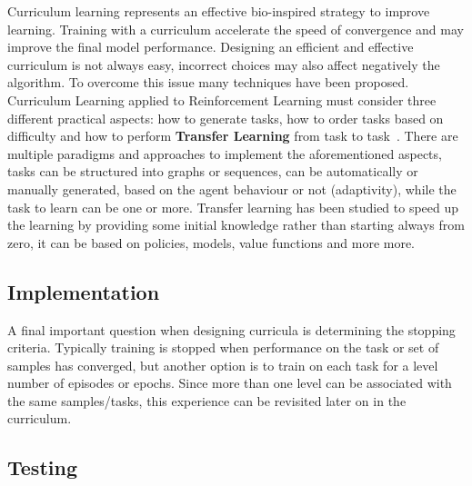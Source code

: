 \documentclass[11pt, a4paper, hidelinks]{report}
\begin{document}
Curriculum learning represents an effective bio-inspired strategy to improve learning.
Training with a curriculum accelerate the speed of convergence and may improve the final model performance.
Designing an efficient and effective curriculum is not always easy, incorrect choices may also affect negatively the algorithm.
To overcome this issue many techniques have been proposed.
Curriculum Learning applied to Reinforcement Learning must consider three different practical aspects: how to generate tasks, how to order tasks based on difficulty and how to perform \textbf{Transfer Learning} from task to task~\cite{narvekar2020curriculum}.
There are multiple paradigms and approaches to implement the aforementioned aspects, tasks can be structured into graphs or sequences, can be automatically or manually generated, based on the agent behaviour or not (adaptivity), while the task to learn can be one or more.
Transfer learning has been studied to speed up the learning by providing some initial knowledge rather than starting always from zero, it can be based on policies, models, value functions and more more.

\subsection{Implementation}\label{subsec:implementation}

A final important question when designing curricula is determining the stopping criteria.
Typically training is stopped when performance on the task or set of samples has converged, but another option is to train on each task for a level number of episodes or epochs.
Since more than one level can be associated with the same samples/tasks, this experience can be revisited later on in the curriculum.

\subsection{Testing}\label{subsec:testing2}

\newpage
~\nocite{*}


\end{document}
